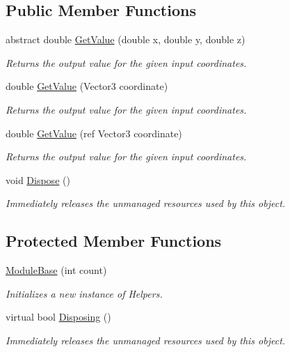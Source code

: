 \subsection*{Public Member Functions}
\begin{DoxyCompactItemize}
\item 
abstract double \hyperlink{class_lib_noise_1_1_module_base_abb3f06725165dc1fda63de23b68f408b}{Get\+Value} (double x, double y, double z)
\begin{DoxyCompactList}\small\item\em Returns the output value for the given input coordinates. \end{DoxyCompactList}\item 
double \hyperlink{class_lib_noise_1_1_module_base_aea8b10f91816c21d0910ebf6aa58fde6}{Get\+Value} (Vector3 coordinate)
\begin{DoxyCompactList}\small\item\em Returns the output value for the given input coordinates. \end{DoxyCompactList}\item 
double \hyperlink{class_lib_noise_1_1_module_base_af442fe2cbe675fbebc9c54ec51f6c2ee}{Get\+Value} (ref Vector3 coordinate)
\begin{DoxyCompactList}\small\item\em Returns the output value for the given input coordinates. \end{DoxyCompactList}\item 
void \hyperlink{class_lib_noise_1_1_module_base_a0f281ab3bfc1fe8aef486a80cbe4db01}{Dispose} ()
\begin{DoxyCompactList}\small\item\em Immediately releases the unmanaged resources used by this object. \end{DoxyCompactList}\end{DoxyCompactItemize}
\subsection*{Protected Member Functions}
\begin{DoxyCompactItemize}
\item 
\hyperlink{class_lib_noise_1_1_module_base_a79db52ea9d135eff82bb3e3213fd668c}{Module\+Base} (int count)
\begin{DoxyCompactList}\small\item\em Initializes a new instance of Helpers. \end{DoxyCompactList}\item 
virtual bool \hyperlink{class_lib_noise_1_1_module_base_a564dbb55fb2a28d5dc7798849508ab2b}{Disposing} ()
\begin{DoxyCompactList}\small\item\em Immediately releases the unmanaged resources used by this object. \end{DoxyCompactList}\end{DoxyCompactItemize}
